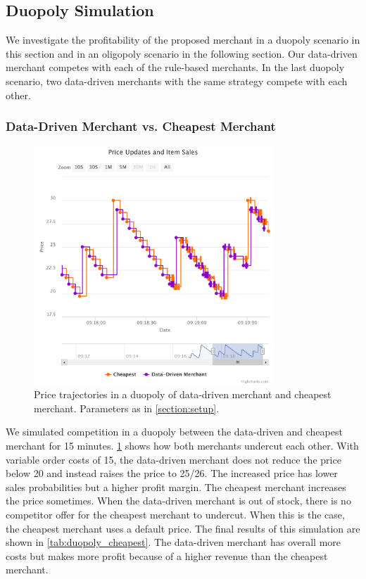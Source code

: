 \subsection{Duopoly Simulation}
\label{section:duopoly}
We investigate the profitability of the proposed merchant in a duopoly scenario in this section and in an oligopoly scenario in the following section.
Our data-driven merchant competes with each of the rule-based merchants.
In the last duopoly scenario, two data-driven merchants with the same strategy compete with each other.

\subsubsection{Data-Driven Merchant vs. Cheapest Merchant}

\begin{figure}[t]
	\centering
	\includegraphics[width=0.8\textwidth]{figures/duopoly_cheapest_prices}
	\caption[Price Trajectories: Data-Driven Merchant versus Cheapest Merchant]{Price trajectories in a duopoly of data-driven merchant and cheapest merchant. Parameters as in \cref{section:setup}.}
	\label{fig:duopoly_cheapest}
\end{figure}

We simulated competition in a duopoly between the data-driven and cheapest merchant for 15 minutes.
\cref{fig:duopoly_cheapest} shows how both merchants undercut each other.
With variable order costs of 15, the data-driven merchant does not reduce the price below 20 and instead raises the price to 25/26.
The increased price has lower sales probabilities but a higher profit margin.
The cheapest merchant increases the price sometimes.
When the data-driven merchant is out of stock, there is no competitor offer for the cheapest merchant to undercut.
When this is the case, the cheapest merchant uses a default price.
The final results of this simulation are shown in \cref{tab:duopoly_cheapest}.
The data-driven merchant has overall more costs but makes more profit because of a higher revenue than the cheapest merchant.

